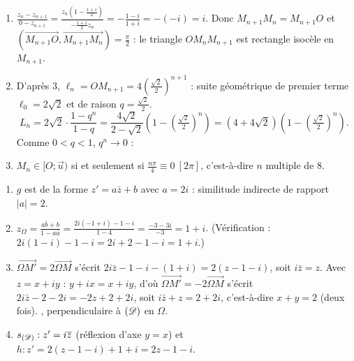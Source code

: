\begin{corrige}
\begin{sol}
\begin{enumerate}
            et $OM_n = 4\left(\frac{\sqrt2}{2}\right)^n$.
      \item $\frac{z_n - z_{n+1}}{0 - z_{n+1}} = \frac{z_n\left(1 - \frac{1+i}{2}\right)}{-\frac{1+i}{2}z_n} = -\frac{1 - i}{1 + i} = -(-i) = i$.
            Donc $M_{n+1}M_n = M_{n+1}O$ et $(\overrightarrow{M_{n+1}O},\overrightarrow{M_{n+1}M_n}) = \frac{\pi}{2}$ :
            le triangle $OM_nM_{n+1}$ est rectangle isocèle en $M_{n+1}$.
      \item D'après 3, $\ell_n = OM_{n+1} = 4\left(\frac{\sqrt2}{2}\right)^{n+1}$ : suite géométrique de premier terme $\ell_0 = 2\sqrt2$ et de raison $q = \frac{\sqrt2}{2}$.
            \[ L_n = 2\sqrt2 \cdot \frac{1 - q^n}{1 - q} = \frac{4\sqrt2}{2 - \sqrt2}\left(1 - \left(\tfrac{\sqrt2}{2}\right)^n\right) = (4 + 4\sqrt2)\left(1 - \left(\tfrac{\sqrt2}{2}\right)^n\right). \]
            Comme $0 < q < 1$, $q^n \to 0$ : 
      \item $M_n \in [O;\vec{u})$ si et seulement si $\frac{n\pi}{4} \equiv 0\ [2\pi]$, c'est-à-dire $n$ multiple de $8$.
\end{enumerate}
\end{sol}
\begin{sol}
\begin{enumerate}
      \item $g$ est de la forme $z' = a\bar{z} + b$ avec $a = 2i$ : similitude indirecte de rapport $|a| = 2$.
      \item $z_\Omega = \frac{a\bar{b} + b}{1 - a\bar{a}} = \frac{2i(-1 + i) - 1 - i}{1 - 4} = \frac{-3 - 3i}{-3} = 1 + i$.
            (Vérification : $2i(1 - i) - 1 - i = 2i + 2 - 1 - i = 1 + i$.)
      \item $\overrightarrow{\Omega M'} = 2\overrightarrow{\Omega M}$ s'écrit $2i\bar{z} - 1 - i - (1+i) = 2(z - 1 - i)$, soit $i\bar{z} = z$.
            Avec $z = x + iy$ : $y + ix = x + iy$, d'où 
            $\overrightarrow{\Omega M'} = -2\overrightarrow{\Omega M}$ s'écrit $2i\bar{z} - 2 - 2i = -2z + 2 + 2i$, soit $i\bar{z} + z = 2 + 2i$,
            c'est-à-dire $x + y = 2$ (deux fois). , perpendiculaire à $(\mathscr{D})$ en $\Omega$.
      \item $s_{(\mathscr{D})} : z' = i\overline{z}$ (réflexion d'axe $y = x$) et $h : z' = 2(z - 1 - i) + 1 + i = 2z - 1 - i$.

\end{enumerate}
\end{sol}
\end{corrige}
